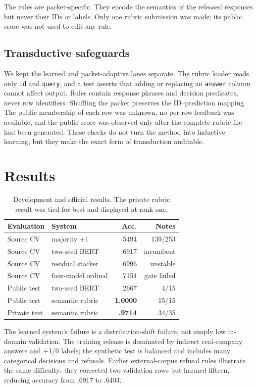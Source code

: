 \documentclass[11pt]{article}
\begin{document}
The rules are packet-specific. They encode the semantics of the released responses but never their IDs or labels. Only one rubric submission was made; its public score was not used to edit any rule.

\subsection{Transductive safeguards}
We kept the learned and packet-adaptive lanes separate.  The rubric loader reads
only \texttt{id} and \texttt{query}, and a test asserts that adding or replacing
an \texttt{answer} column cannot affect output.  Rules contain response phrases
and decision predicates, never row identifiers.  Shuffling the packet preserves
the ID--prediction mapping.  The public membership of each row was unknown, no
per-row feedback was available, and the public score was observed only after
the complete rubric file had been generated.  These checks do not turn the
method into inductive learning, but they make the exact form of transduction
auditable.

\section{Results}
\begin{table}[t]
\centering
\small
\setlength{\tabcolsep}{3.5pt}
\begin{tabular}{@{}llrr@{}}
\toprule
Evaluation & System & Acc. & Notes \\
\midrule
Source CV & majority +1 & .5494 & 139/253 \\
Source CV & two-seed BERT & .6917 & incumbent \\
Source CV & residual stacker & .6996 & unstable \\
Source CV & four-model ordinal & .7154 & gate failed \\
Public test & two-seed BERT & .2667 & 4/15 \\
Public test & semantic rubric & \textbf{1.0000} & 15/15 \\
Private test & semantic rubric & \textbf{.9714} & 34/35 \\
\bottomrule
\end{tabular}
\caption{Development and official results. The private rubric result was tied for best and displayed at rank one.}
\label{tab:results2}
\end{table}

The learned system's failure is a distribution-shift failure, not simply low in-domain validation. The training release is dominated by indirect real-company answers and +1/0 labels; the synthetic test is balanced and includes many categorical decisions and refusals. Earlier external-corpus refusal rules illustrate the same difficulty: they corrected two validation rows but harmed fifteen, reducing accuracy from .6917 to .6403.
\end{document}
